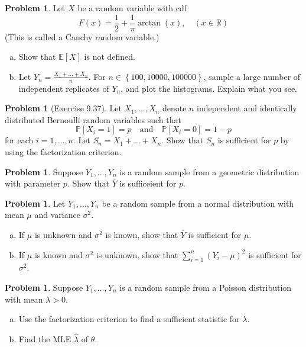 \documentclass[10pt]{article}
\theoremstyle{definition}
\newtheorem{problem}[theorem]{Problem}
\newcommand{\1}[1]{\textbf{1}_{\left[#1\right]}} %
\def\R{\mathbb{R}} %
\def\E{\mathbb{E}} %
\def\P{\mathbb{P}} %
\begin{document}
\begin{problem}
  Let $X$ be a random variable with cdf
  \begin{equation*}
    F(x) = \frac{1}{2}+ \frac{1}{\pi}\arctan(x), \quad (x\in \R)
  \end{equation*}
  (This is called a Cauchy random variable.)
  \begin{enumerate}[(a)]
    \item Show that $\E\left[X \right]$ is not defined.
    \item Let $Y_{n} = \frac{X_{1}+\ldots+X_{n}}{n}$. For
    $n\in \left\{100, 10000, 100000\right\}$, sample a large number of
    independent replicates of $Y_{n}$, and plot the histograms. Explain what
    you see.
  \end{enumerate}
\end{problem}


\begin{problem}[Exercise 9.37]
  Let $X_{1},\ldots,X_{n}$ denote $n$ independent and identically distributed
  Bernoulli random variables such that
  \begin{equation*}
    \P\left[X_{i}=1 \right] = p \quad \text{and} \quad  \P\left[ X_{i}=0\right]=1-p
  \end{equation*}
  for each $i=1,\ldots,n$. Let $S_{n} = X_{1}+\ldots+X_{n}$. Show that $S_{n}$
  is sufficient for $p$ by using the factorization criterion.
\end{problem}

\begin{problem}
  Suppose $Y_{1},\ldots,Y_{n}$ is a random sample from a geometric
  distribution with parameter $p$. Show that $\overline{Y}$ is sufficeient for
  $p$.
\end{problem}

\begin{problem}
  Let $Y_{1},\ldots,Y_{n}$ be a random sample from a normal distribution with
  mean $\mu$ and variance $\sigma^{2}$.
  \begin{enumerate}[(a)]
    \item If $\mu$ is unknown and $\sigma^{2}$ is known, show that
    $\overline{Y}$ is sufficient for $\mu$. 
    \item If $\mu$ is known and $\sigma^{2}$ is unknown, show that
    $\sum_{i=1}^{n}(Y_{i}-\mu)^{2}$ is sufficient for $\sigma^{2}$.
  \end{enumerate}
\end{problem}


\begin{problem}
  Suppose $Y_{1},\ldots,Y_{n}$ is a random sample from a Poisson distribution
  with mean $\lambda>0$.
  \begin{enumerate}[(a)]
    \item Use the factorization criterion to find a sufficient statistic for
    $\lambda$.
    \item Find the MLE $\widehat{\lambda}$ of $\theta$.
  \end{enumerate}
\end{problem}
\end{document}
